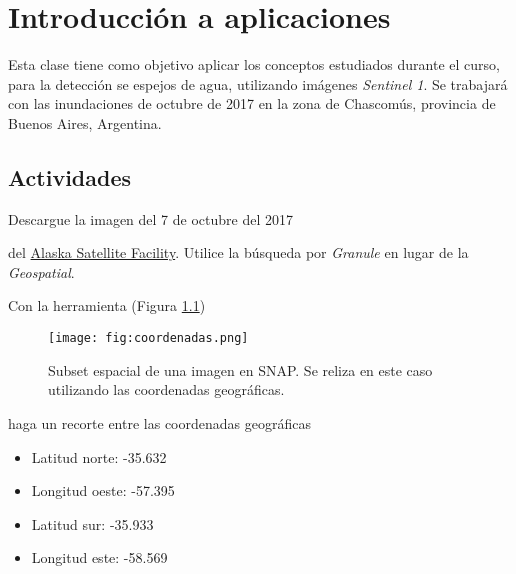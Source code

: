 \chapter{Introducción a aplicaciones}

Esta clase tiene como objetivo aplicar los conceptos estudiados durante el curso, para la detección se espejos de agua, utilizando imágenes \emph{Sentinel 1}. Se trabajará con las inundaciones de octubre de 2017 en la zona de Chascomús, provincia de Buenos Aires, Argentina.



\section{Actividades}

\begin{que}
    Descargue la imagen del 7 de octubre del 2017
    \begin{center}\end{center} del \href{https://vertex.daac.asf.alaska.edu/}{Alaska Satellite Facility}. Utilice la búsqueda por \emph{Granule} en lugar de la \emph{Geospatial}.
\end{que}

\begin{que}
    Con la herramienta  (Figura \ref{fig:coordenadas})
    \begin{figure}[h!]
        \centering
        \texttt{[image: fig:coordenadas.png]}
        \caption{Subset espacial de una imagen en SNAP. Se reliza en este caso utilizando las coordenadas geográficas.}
        \label{fig:coordenadas}
    \end{figure}

    haga un recorte entre las coordenadas geográficas
    \begin{itemize}
        \item Latitud norte: -35.632
        \item Longitud oeste: -57.395
        \item Latitud sur: -35.933
        \item Longitud este: -58.569
    \end{itemize}


\end{que}

